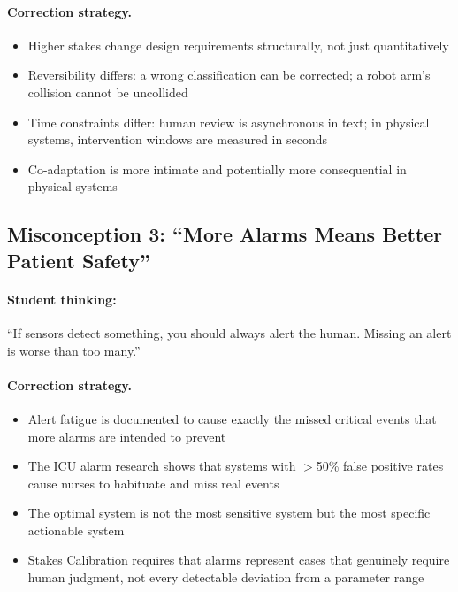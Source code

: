 \paragraph{Correction strategy.}
\begin{itemize}
    \item Higher stakes change design requirements structurally, not just quantitatively
    \item Reversibility differs: a wrong classification can be corrected; a robot arm's collision cannot be uncollided
    \item Time constraints differ: human review is asynchronous in text; in physical systems, intervention windows are measured in seconds
    \item Co-adaptation is more intimate and potentially more consequential in physical systems
\end{itemize}

\subsection{Misconception 3: ``More Alarms Means Better Patient Safety''}

\paragraph{Student thinking:} ``If sensors detect something, you should always alert the human. Missing an alert is worse than too many.''

\paragraph{Correction strategy.}
\begin{itemize}
    \item Alert fatigue is documented to cause exactly the missed critical events that more alarms are intended to prevent
    \item The ICU alarm research shows that systems with $>$50\% false positive rates cause nurses to habituate and miss real events
    \item The optimal system is not the most sensitive system but the most specific actionable system
    \item Stakes Calibration requires that alarms represent cases that genuinely require human judgment, not every detectable deviation from a parameter range
\end{itemize}

